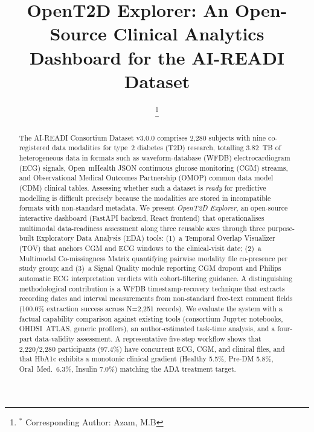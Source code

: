 \documentclass[conference]{IEEEtran}
\begin{document}
\title{OpenT2D Explorer: An Open-Source Clinical Analytics Dashboard for the AI-READI Dataset}

\author{
\thanks{$^*$ Corresponding Author: Azam, M.B  }
}

\maketitle

\begin{abstract}
The AI-READI Consortium Dataset v3.0.0 comprises 2,280 subjects with nine co-registered data modalities for type~2 diabetes (T2D) research, totalling 3.82~TB of heterogeneous data in formats such as waveform-database (WFDB) electrocardiogram (ECG) signals, Open~mHealth JSON continuous glucose monitoring (CGM) streams, and Observational Medical Outcomes Partnership (OMOP) common data model (CDM) clinical tables. Assessing whether such a dataset is \emph{ready} for predictive modelling is difficult precisely because the modalities are stored in incompatible formats with non-standard metadata. We present \emph{OpenT2D Explorer}, an open-source interactive dashboard (FastAPI backend, React frontend) that operationalises multimodal data-readiness assessment along three reusable axes through three purpose-built Exploratory Data Analysis (EDA) tools: (1)~a Temporal Overlap Visualizer (TOV) that anchors CGM and ECG windows to the clinical-visit date; (2)~a Multimodal Co-missingness Matrix quantifying pairwise modality file co-presence per study group; and (3)~a Signal Quality module reporting CGM dropout and Philips automatic ECG interpretation verdicts with cohort-filtering guidance. A distinguishing methodological contribution is a WFDB timestamp-recovery technique that extracts recording dates and interval measurements from non-standard free-text comment fields (100.0\% extraction success across N=2,251 records). We evaluate the system with a factual capability comparison against existing tools (consortium Jupyter notebooks, OHDSI~ATLAS, generic profilers), an author-estimated task-time analysis, and a four-part data-validity assessment. A representative five-step workflow shows that 2,220/2,280 participants (97.4\%) have concurrent ECG, CGM, and clinical files, and that HbA1c exhibits a monotonic clinical gradient (Healthy 5.5\%, Pre-DM 5.8\%, Oral~Med.\ 6.3\%, Insulin 7.0\%) matching the ADA treatment target.
\end{abstract}
\end{document}

